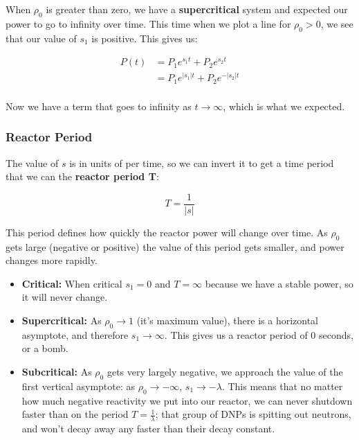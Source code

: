 \documentclass[letter]{article}
\begin{document}
When $\rho_0$ is greater than zero, we have a \textbf{supercritical}
system and expected our power to go to infinity over time. This time
when we plot a line for $\rho_0>0$, we see that our value of $s_1$ is
positive. This gives us:

\begin{equation*}
  \begin{split}
    P(t)&=P_1e^{s_1t}+P_2e^{s_2t} \\
    &=P_1e^{|s_1|t}+P_2e^{-|s_2|t} \\
  \end{split}
\end{equation*}

Now we have a term that goes to infinity as $t\to\infty$, which is
what we expected.

\subsubsection{Reactor Period}

The value of $s$ is in units of per time, so we can invert it to get a
time period that we can the \textbf{reactor period T}:

\begin{equation*}
  T=\frac{1}{|s|}
\end{equation*}

This period defines how quickly the reactor power will change over
time. As $\rho_0$ gets large (negative or positive) the value of this
period gets smaller, and power changes more rapidly.

\begin{itemize}
\item \textbf{Critical:} When critical $s_1=0$ and $T=\infty$ because
  we have a stable power, so it will never change.
\item \textbf{Supercritical:} As $\rho_0\to 1$ (it's maximum value),
  there is a horizontal asymptote, and therefore $s_1\to\infty$. This
  gives us a reactor period of 0 seconds, or a bomb.
\item \textbf{Subcritical:} As $\rho_0$ gets very largely negative, we
  approach the value of the first vertical asymptote: as
  $\rho_0\to -\infty$, $s_1\to -\lambda$. This means that no matter
  how much negative reactivity we put into our reactor, we can never
  shutdown faster than on the period $T=\frac{1}{\lambda}$;
  that group of DNPs is spitting out neutrons, and won't decay away
  any faster than their decay constant.
\end{itemize}
\end{document}
